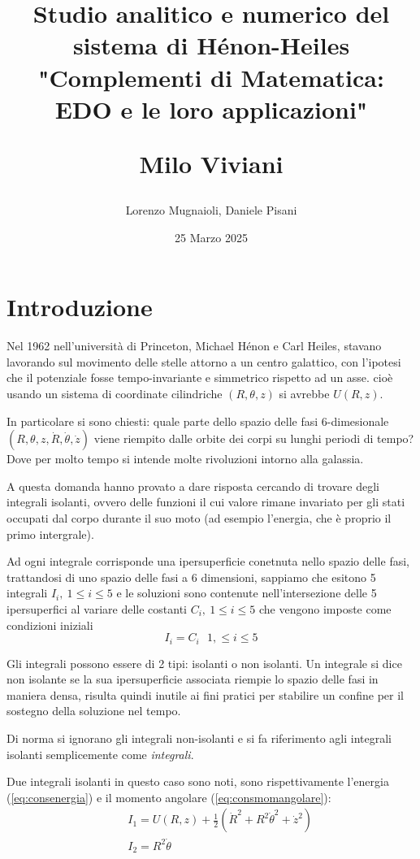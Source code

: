 \documentclass[a4paper]{article}
\title{
	Studio analitico e numerico del sistema di Hénon-Heiles\\
	\vspace{1cm}	
	"Complementi di Matematica: EDO e le loro applicazioni"\\
	\begin{large}
		Milo Viviani
	\end{large}
	\vspace{1cm}

}
\date{25 Marzo 2025}
\author{Lorenzo Mugnaioli, Daniele Pisani}
\numberwithin{equation}{section}
\numberwithin{figure}{section}
\begin{document}
\maketitle
\clearpage
\tableofcontents
\clearpage

\section{Introduzione}
Nel 1962 nell'università di Princeton, Michael Hénon e  Carl Heiles,
stavano lavorando sul movimento delle stelle attorno a un centro galattico,
con l'ipotesi che il potenziale fosse tempo-invariante e simmetrico rispetto ad un asse.
cioè usando un sistema di coordinate cilindriche $(R,\theta,z)$ si avrebbe $U(R,z)$.

In particolare si sono chiesti:
quale parte dello spazio delle fasi 6-dimesionale $(R,\theta,z, \dot{R},\dot{\theta}, \dot{z})$
viene riempito dalle orbite dei corpi su lunghi periodi di tempo? \cite{1964henonheiles}
Dove per molto tempo si intende molte rivoluzioni intorno alla galassia.

A questa domanda hanno provato a dare risposta cercando di trovare degli integrali isolanti,
ovvero delle funzioni il cui valore rimane invariato per gli stati occupati dal corpo durante
il suo moto (ad esempio l'energia, che è proprio il primo intergrale).

Ad ogni integrale corrisponde una ipersuperficie conetnuta nello spazio delle fasi, trattandosi di uno spazio
delle fasi a 6 dimensioni, sappiamo che esitono 5 integrali $I_i,\ 1\le i\le 5$ e le soluzioni
sono contenute nell'intersezione delle 5 ipersuperfici al variare delle costanti
$C_i,\ 1\le i\le 5$ che vengono imposte come condizioni iniziali
\begin{equation}
	I_i = C_i\ \ \  1,\le i\le 5
\end{equation}

Gli integrali possono essere di 2 tipi: isolanti o non isolanti. Un integrale si dice non isolante
se la sua ipersuperficie associata riempie lo spazio delle fasi in maniera densa, risulta quindi inutile
ai fini pratici per stabilire un confine per il sostegno della soluzione nel tempo.

Di norma si ignorano gli integrali non-isolanti e si fa riferimento agli integrali isolanti semplicemente
come \textit{integrali}.

Due integrali isolanti in questo caso sono noti, sono rispettivamente l'energia (\ref{eq:consenergia})
e il momento angolare (\ref{eq:consmomangolare}):
\begin{eqnarray}
	&&I_1 = U(R,z) + \frac{1}{2}(\dot{R}^2+R^2\dot{\theta}^2+\dot{z}^2) \label{eq:consenergia}\\
	&&I_2 = R^2\dot{\theta} \label{eq:consmomangolare}
\end{eqnarray}
\end{document}
